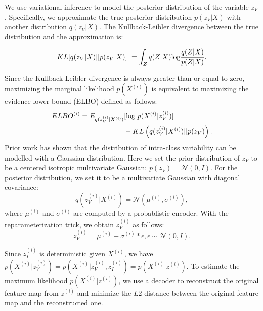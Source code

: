 \documentclass[10pt,twocolumn,letterpaper]{article}
\begin{document}
      We use variational inference to model the posterior distribution of the variable $z_V$. Specifically, we approximate the true posterior distribution $p(z_{V}|X)$ with another distribution $q(z_{V}|X)$. The Kullback-Leibler divergence between the true distribution and the approximation is:


      
      \begin{equation} \label{KL Divergence}
          KL[q(z_{V}|X)||p(z_{V}|X)]\ = \int_Z q(Z|X) \textnormal{log} 
          \frac{q(Z|X)}{p(Z|X)}.
      \end{equation}
      
      Since the Kullback-Leibler divergence is always greater than or equal to zero, maximizing the marginal likelihood $p(X^{(i)})$ is equivalent to maximizing the evidence lower bound (ELBO) defined as follows:
\small
      \begin{equation} \label{ELBO}
      \begin{split}
          ELBO^{(i)} = E_{q(z_{V}^{(i)}|X^{(i)})}&[\textnormal{log }p(X^{(i)}|z_V^{(i)})] \\
          &- KL\left(q(z_V^{(i)}|X^{(i)})||p(z_V)\right).
      \end{split}
      \end{equation}
      \normalsize
Prior work \cite{metric_learning,feature_transfer,variational_fewshot} has shown that the distribution of intra-class variability can be modelled with a Gaussian distribution.
Here we set the prior distribution of $z_V$ to be a centered isotropic multivariate Gaussian: $p(z_V) = \mathcal{N}(0, I)$.
For the posterior distribution, we set it to be a multivariate Gaussian with diagonal covariance:
      \begin{equation}
        q(z_V^{(i)}|X^{(i)}) = \mathcal{N}(\mu^{(i)}, \sigma^{(i)}),
      \end{equation}
      \noindent where $\mu^{(i)}$ and $\sigma^{(i)}$ are computed by a probablistic encoder.
With the reparameterization trick, we obtain $z_V^{(i)}$ as follows:
      \begin{equation}\label{reparameterization}
        z_{V}^{(i)} = \mu^{(i)} + \sigma^{(i)} * \epsilon, \epsilon \sim \mathcal{N}(0, I).
      \end{equation} 
  
Since $z_I^{(i)}$ is deterministic given $X^{(i)}$, we have $p(X^{(i)}|z_V^{(i)}) = p(X^{(i)}|z_V^{(i)}, z_I^{(i)}) = p(X^{(i)}| z^{(i)})$.
      To estimate the maximum likelihood $p(X^{(i)}| z^{(i)})$, we use a decoder to reconstruct
      the original feature map from $z^{(i)}$ and minimize the $L2$ distance between
      the original feature map and the reconstructed one.
      
\end{document}
